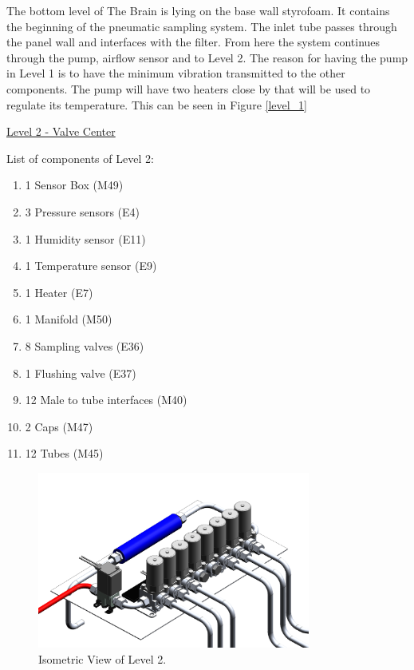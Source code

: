 \smallskip
The bottom level of The Brain is lying on the base wall styrofoam. It contains the beginning of the pneumatic sampling system. The inlet tube passes through the panel wall and interfaces with the filter. From here the system continues through the pump, airflow sensor and to Level 2.
The reason for having the pump in Level 1 is to have the minimum vibration transmitted to the other components. The pump will have two heaters close by that will be used to regulate its temperature. This can be seen in Figure \ref{level_1}


\pagebreak
\underline{Level 2 - Valve Center}


List of components of Level 2:

\begin{enumerate}[label=\Alph*.]
    \item 1 Sensor Box (M49)
    \item 3 Pressure sensors (E4)
    \item 1 Humidity sensor (E11)
    \item 1 Temperature sensor (E9)
    \item 1 Heater (E7)
    \item 1 Manifold (M50)
    \item 8 Sampling valves (E36)
    \item 1 Flushing valve (E37)
    \item 12 Male to tube interfaces (M40)
    \item 2 Caps (M47)
    \item 12 Tubes (M45)
\end{enumerate}


\begin{figure}[H]
    \centering
    \includegraphics[width=0.8\textwidth]{4-experiment-design/img/Mechanical/Level_2.png}
    \caption{Isometric View of Level 2.}
    \label{level_2}
\end{figure}

